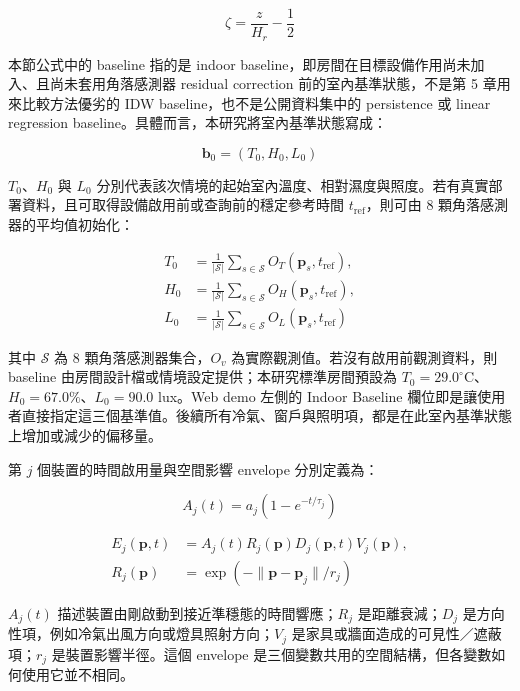 \documentclass[12pt,a4paper]{article}
\begin{document}
\[
\zeta=\frac{z}{H_r}-\frac{1}{2}
\]

本節公式中的 baseline 指的是 indoor baseline，即房間在目標設備作用尚未加入、且尚未套用角落感測器 residual correction 前的室內基準狀態，不是第 5 章用來比較方法優劣的 IDW baseline，也不是公開資料集中的 persistence 或 linear regression baseline。具體而言，本研究將室內基準狀態寫成：


\[
\mathbf{b}_0=(T_0,H_0,L_0)
\]

$T_0$、$H_0$ 與 $L_0$ 分別代表該次情境的起始室內溫度、相對濕度與照度。若有真實部署資料，且可取得設備啟用前或查詢前的穩定參考時間 $t_{\mathrm{ref}}$，則可由 8 顆角落感測器的平均值初始化：


\[
\begin{aligned}T_0&=\frac{1}{|\mathcal{S}|}\sum_{s\in\mathcal{S}}O_T(\mathbf{p}_s,t_{\mathrm{ref}}),\\H_0&=\frac{1}{|\mathcal{S}|}\sum_{s\in\mathcal{S}}O_H(\mathbf{p}_s,t_{\mathrm{ref}}),\\L_0&=\frac{1}{|\mathcal{S}|}\sum_{s\in\mathcal{S}}O_L(\mathbf{p}_s,t_{\mathrm{ref}})\end{aligned}
\]

其中 $\mathcal{S}$ 為 8 顆角落感測器集合，$O_v$ 為實際觀測值。若沒有啟用前觀測資料，則 baseline 由房間設計檔或情境設定提供；本研究標準房間預設為 $T_0=29.0^\circ\mathrm{C}$、$H_0=67.0\%$、$L_0=90.0$ lux。Web demo 左側的 Indoor Baseline 欄位即是讓使用者直接指定這三個基準值。後續所有冷氣、窗戶與照明項，都是在此室內基準狀態上增加或減少的偏移量。


第 $j$ 個裝置的時間啟用量與空間影響 envelope 分別定義為：


\[
A_j(t)=a_j\left(1-e^{-t/\tau_j}\right)
\]

\[
\begin{aligned}E_j(\mathbf{p},t)&=A_j(t)R_j(\mathbf{p})D_j(\mathbf{p},t)V_j(\mathbf{p}),\\R_j(\mathbf{p})&=\exp(-\|\mathbf{p}-\mathbf{p}_j\|/r_j)\end{aligned}
\]

$A_j(t)$ 描述裝置由剛啟動到接近準穩態的時間響應；$R_j$ 是距離衰減；$D_j$ 是方向性項，例如冷氣出風方向或燈具照射方向；$V_j$ 是家具或牆面造成的可見性／遮蔽項；$r_j$ 是裝置影響半徑。這個 envelope 是三個變數共用的空間結構，但各變數如何使用它並不相同。
\end{document}
